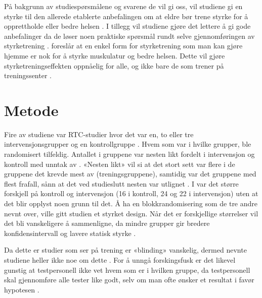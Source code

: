 \documentclass[
]{book}
\begin{document}
På bakgrunn av studiespørsmålene og svarene de vil gi oss, vil studiene gi en styrke til den allerede etablerte anbefalingen om at eldre bør trene styrke for å opprettholde eller bedre helsen \citep[ \citet{vincent2002}]{geirsdottir2012, schott2019, turpela2017, vikberg2019}. I tillegg vil studiene gjøre det lettere å gi gode anbefalinger da de løser noen praktiske spørsmål rundt selve gjennomføringen av styrketrening \citetext{\citealp[ ]{geirsdottir2012}; \citealp{schott2019}; \citealp{turpela2017}; \citealp{vikberg2019}; \citealp{vincent2002}}. \citet{vikberg2019} foreslår at en enkel form for styrketrening som man kan gjøre hjemme er nok for å styrke muskulatur og bedre helsen. Dette vil gjøre styrketreningseffekten oppnåelig for alle, og ikke bare de som trener på treningssenter \citep{vikberg2019}.

\hypertarget{metode-2}{%
\section{Metode}\label{metode-2}}

Fire av studiene var RTC-studier hvor det var en, to eller tre intervensjonsgrupper og en kontrollgruppe \citep{schott2019, turpela2017, vikberg2019, vincent2002}. Hvem som var i hvilke grupper, ble randomisert tilfeldig. Antallet i gruppene var nesten likt fordelt i intervensjon og kontroll med unntak av \citet{vincent2002} . «Nesten likt» vil si at det stort sett var flere i de gruppene det krevde mest av (treningsgruppene), samtidig var det gruppene med flest frafall, sånn at det ved studieslutt nesten var utlignet \citep{schott2019, turpela2017, vikberg2019}. I \citet{vincent2002} var det større forskjell på kontroll og intervensjon (16 i kontroll, 24 og 22 i intervensjon) uten at det blir opplyst noen grunn til det. Å ha en blokkrandomisering som de tre andre nevnt over, ville gitt studien et styrket design. Når det er forskjellige størrelser vil det bli vanskeligere å sammenligne, da mindre grupper gir bredere konfidensintervall og lavere statisk styrke \citep[s. 63, 146]{hulley2013}.

Da dette er studier som ser på trening er «blinding» vanskelig, dermed nevnte studiene heller ikke noe om dette \citep{geirsdottir2012, schott2019, turpela2017, vikberg2019, vincent2002}. For å unngå forskingsfusk er det likevel gunstig at testpersonell ikke vet hvem som er i hvilken gruppe, da testpersonell skal gjennomføre alle tester like godt, selv om man ofte ønsker et resultat i favør hypotesen \citep[s. 148-149]{hulley2013}.
\end{document}
